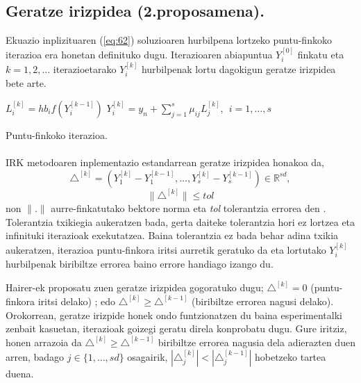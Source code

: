 \subsection{Geratze irizpidea (2.proposamena).}

Ekuazio inplizituaren (\ref{eq:62}) soluzioaren hurbilpena lortzeko puntu-finkoko iterazioa era honetan definituko dugu. Iterazioaren abiapuntua $Y_i^{[0]}$  finkatu eta $k=1,2,\dots$ iterazioetarako $Y_i^{[k]}$ hurbilpenak lortu dagokigun geratze irizpidea bete arte.

\begin{algorithm}[H]
  {
   $L_i^{[k]}=hb_if(Y_i^{[k-1]}) $\;
   $Y_i^{[k]}=y_n+\sum\limits_{j=1}^{s} \mu_{ij} L_j^{[k]} , \ \  i=1,\dots,s $\; 
   }
 \caption{Puntu-finkoko iterazioa.}
\end{algorithm}
 
\paragraph*{}IRK metodoaren inplementazio estandarrean geratze irizpidea honakoa da,
\begin{equation*}
\triangle^{[k]}=(Y_1^{[k]}-Y_1^{[k-1]},\dots,Y_s^{[k]}-Y_s^{[k-1]}) \in \mathbb{R}^{sd},
\end{equation*} 
\begin{equation}
\|\triangle^{[k]}\| \le tol
\end{equation}
non $\|.\|$ aurre-finkatutako bektore norma eta \emph{tol} tolerantzia errorea den . Tolerantzia txikiegia aukeratzen bada, gerta daiteke tolerantzia hori ez lortzea eta infinituki iterazioak exekutatzea. Baina tolerantzia ez bada behar adina txikia  aukeratzen, iterazioa puntu-finkora iritsi aurretik geratuko da eta lortutako $Y_i^{[k]}$ hurbilpenak biribiltze errorea baino errore handiago izango du.

Hairer-ek proposatu zuen geratze irizpidea gogoratuko dugu; $\triangle^{[k]} = 0$ (puntu-finkora iritsi delako) ;  edo   $\triangle^{[k]} \geqslant \triangle^{[k-1]}$ (biribiltze errorea nagusi delako). Orokorrean, geratze irizpide honek ondo funtzionatzen du baina esperimentalki zenbait kasuetan, iterazioak goizegi geratu direla konprobatu dugu. Gure iritziz, honen arrazoia da $\triangle^{[k]} \geqslant \triangle^{[k-1]}$ biribiltze errorea nagusia dela adierazten duen arren, badago $j \in \{1,\dots,sd\}$ osagairik,   $|\triangle_j^{[k]}| < |\triangle_j^{[k-1]}|$ hobetzeko tartea duena. 


